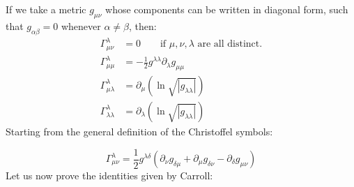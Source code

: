 \documentclass[12pt]{report}
\begin{document}
	If we take a metric $g_{\mu\nu}$ whose components can be written in diagonal form, such that $g_{\alpha\beta} = 0$ whenever $\alpha \neq \beta$, then:
	\begin{align}
		\Gamma^{\lambda}_{\mu\nu} &= 0 \qquad \text{if }\mu,\nu,\lambda\text{ are all distinct.}\\
		\Gamma^{\lambda}_{\mu\mu} &= -\frac{1}{2}g^{\lambda\lambda}\partial_{\lambda}g_{\mu\mu} \\
		\Gamma^{\lambda}_{\mu\lambda} &= \partial_{\mu}(\ln\sqrt{|g_{\lambda\lambda}|}) \\
		\Gamma^{\lambda}_{\lambda\lambda} &= \partial_{\lambda}(\ln\sqrt{|g_{\lambda\lambda}|})
	\end{align}
	Starting from the general definition of the Christoffel symbols:
	
	\begin{equation}
		\Gamma^\lambda_{\mu\nu} = \frac{1}{2} g^{\lambda\delta}
		(\partial_\nu g_{\delta\mu} + \partial_\mu g_{\delta\nu} - \partial_\delta g_{\mu\nu})
	\end{equation}
	Let us now prove the identities given by Carroll:
	
\end{document}
